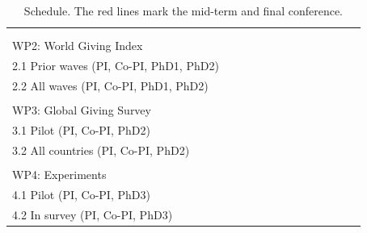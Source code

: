 \documentclass[twocolumn, serif, rga, numeric]{jote-article}
\begin{document}
\begin{table}[t]
\begin{tabularx}{\textwidth}{|l|X|X|X|p{}!{\color{red}\vrule}p{0.04\columnwidth}|X|X|X|X|X|p{0.04\columnwidth}!{\color{red}\vrule}p{0.04\columnwidth}|}
\hline
                    \\[-2ex]
             \\[-2ex]
\hline
WP2: World Giving Index                 &    &    &    &    &    &    &    &    &    &    & &\\
2.1 Prior waves (PI, Co-PI, PhD1, PhD2) &    &  &  &  & &    &    &    &    &    &    &\\
2.2 All waves (PI, Co-PI, PhD1, PhD2)   &    &    &  &  & &  &  &  &  &    &    &\\
\hline
                                          \\
\hline
WP3: Global Giving Survey  & &  &  && &&&& &  &   & \\
3.1 Pilot (PI, Co-PI, PhD2)             &    &  &  &  & &    &    &    &    &    & &    \\
3.2 All countries (PI, Co-PI, PhD2)     &    &    &    &    & &  &  &  &  &  &  &  \\
\hline
                     \\
\hline
WP4: Experiments &  & & &  &  &  &  &  &  &  & &  \\
4.1 Pilot (PI, Co-PI, PhD3)             &    &    &    &  & &  &  &    &    &    & &    \\
4.2 In survey (PI, Co-PI, PhD3)         &    &    &    &    &    & &  &  &  &  &  &  \\
\hline
\end{tabularx}
\caption{Schedule. The red lines mark the mid-term and final conference.}
\label{tab:schedule}
\vspace{-2\baselineskip}
\end{table}
\end{document}
